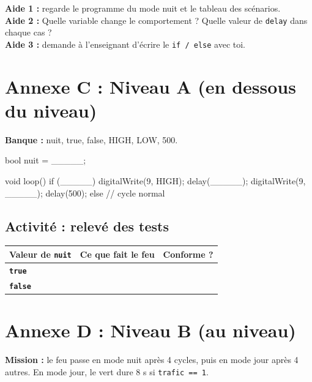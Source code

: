 \documentclass[11pt,a4paper]{article}
\begin{document}
\begin{tcolorbox}[colback=yellow!10,colframe=yellow!50!black,title={Cartes d'aide à utiliser dans l'ordre},fonttitle=\bfseries\small]
\textbf{Aide 1 :} regarde le programme du mode nuit et le tableau des scénarios.\\
\textbf{Aide 2 :} Quelle variable change le comportement ? Quelle valeur de \texttt{delay} dans chaque cas ?\\
\textbf{Aide 3 :} demande à l'enseignant d'écrire le \texttt{if / else} avec toi.
\end{tcolorbox}

\newpage
\section*{Annexe C : Niveau A (en dessous du niveau)}

\textbf{Banque :} nuit, true, false, HIGH, LOW, 500.

\begin{arduino}
bool nuit = _____;

void loop() {
  if (_____) {
    digitalWrite(9, HIGH); delay(_____);
    digitalWrite(9, _____); delay(500);
  } else {
    // cycle normal
  }
}
\end{arduino}

\subsection*{Activité : relevé des tests}
\begin{tabularx}{\linewidth}{>{\bfseries}p{3.4cm}Y Y}
\toprule
Valeur de \texttt{nuit} & Ce que fait le feu & Conforme ?\\
\midrule
\texttt{true} & & \\ \texttt{false} & & \\
\bottomrule
\end{tabularx}

\newpage
\section*{Annexe D : Niveau B (au niveau)}

\textbf{Mission :} le feu passe en mode nuit après 4 cycles, puis en mode jour après 4 autres. En mode jour, le vert dure 8 s si \texttt{trafic == 1}.
\end{document}
